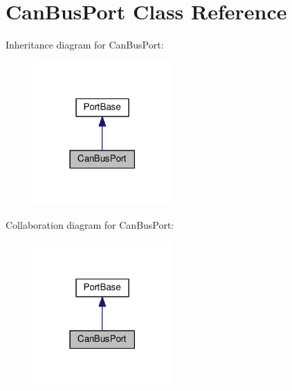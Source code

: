 \hypertarget{classCanBusPort}{}\section{Can\+Bus\+Port Class Reference}
\label{classCanBusPort}


Inheritance diagram for Can\+Bus\+Port\+:
\nopagebreak
\begin{figure}[H]
\begin{center}
\leavevmode
\includegraphics[width=150pt]{classCanBusPort__inherit__graph}
\end{center}
\end{figure}


Collaboration diagram for Can\+Bus\+Port\+:
\nopagebreak
\begin{figure}[H]
\begin{center}
\leavevmode
\includegraphics[width=150pt]{classCanBusPort__coll__graph}
\end{center}
\end{figure}
